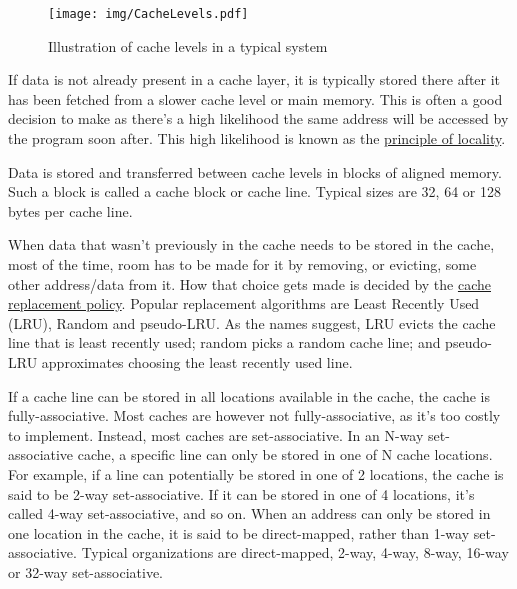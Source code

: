 \documentclass[a4paper,]{report}
\makeatletter
\newcounter{figno}
\newenvironment{fignos:no-prefix-figure-caption}{
  \caption@ifcompatibility{}{
    \let\oldthefigure\thefigure
    \let\oldtheHfigure\theHfigure
    \renewcommand{\thefigure}{figno:\thefigno}
    \renewcommand{\theHfigure}{figno:\thefigno}
    \stepcounter{figno}
    \captionsetup{labelformat=empty}
  }
}{
  \caption@ifcompatibility{}{
    \captionsetup{labelformat=default}
    \let\thefigure\oldthefigure
    \let\theHfigure\oldtheHfigure
    \addtocounter{figure}{-1}
  }
}
\makeatother
\begin{document}
\begin{fignos:no-prefix-figure-caption}

\begin{figure}
\centering
\texttt{[image: img/CacheLevels.pdf]}
\caption{Illustration of cache levels in a typical system}
\end{figure}

\end{fignos:no-prefix-figure-caption}

If data is not already present in a cache layer, it is typically stored
there after it has been fetched from a slower cache level or main
memory. This is often a good decision to make as there's a high
likelihood the same address will be accessed by the program soon after.
This high likelihood is known as the
\href{https://en.wikipedia.org/wiki/Locality_of_reference}{principle of
locality}.

Data is stored and transferred between cache levels in blocks of aligned
memory. Such a block is called a cache block or cache
line. Typical sizes are 32, 64 or 128 bytes per cache
line.

When data that wasn't previously in the cache needs to be stored in the
cache, most of the time, room has to be made for it by removing, or
evicting, some other address/data from it. How
that choice gets made is decided by the
\href{https://en.wikipedia.org/wiki/Cache_replacement_policies}{cache
replacement policy}. Popular replacement algorithms are Least Recently
Used (LRU),
Random and
pseudo-LRU. As the names suggest,
LRU evicts the cache line that is least recently used; random picks a
random cache line; and pseudo-LRU approximates choosing the least
recently used line.

If a cache line can be stored in all locations available in the cache,
the cache is fully-associative. Most
caches are however not fully-associative, as it's too costly to
implement. Instead, most caches are
set-associative. In an N-way
set-associative cache, a specific line can only be stored in one of N
cache locations. For example, if a line can potentially be stored in one
of 2 locations, the cache is said to be 2-way set-associative. If it can
be stored in one of 4 locations, it's called 4-way set-associative, and
so on. When an address can only be stored in one location in the cache,
it is said to be direct-mapped, rather than 1-way set-associative. Typical organizations are
direct-mapped, 2-way, 4-way, 8-way, 16-way or 32-way set-associative.
\end{document}

